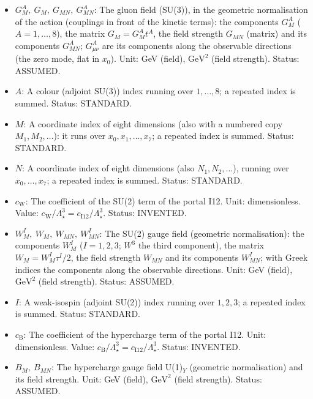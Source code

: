 \documentclass[
  10pt,
]{article}
\begin{document}
\begin{itemize}
  \(c_{\mathrm{G}}/\Lambda_\star^3 = c_{\mathrm{I12}}/\Lambda_\star^3\).
  Status: INVENTED.
\item
  \(G^A_M,\ G_M,\ G_{MN},\ G^A_{MN}\): The gluon field (SU(3)), in the
  geometric normalisation of the action (couplings in front of the
  kinetic terms): the components \(G^A_M\) (\(A = 1, \dots, 8\)), the
  matrix \(G_M = G^A_Mt^A\), the field strength \(G_{MN}\) (matrix) and
  its components \(G^A_{MN}\); \(G^A_{\mu\nu}\) are its components along
  the observable directions (the zero mode, flat in \(x_0\)). Unit: GeV
  (field), \(\mathrm{GeV}^{2}\) (field strength). Status: ASSUMED.
\item
  \(A\): A colour (adjoint SU(3)) index running over \(1, \dots, 8\); a
  repeated index is summed. Status: STANDARD.
\item
  \(M\): A coordinate index of eight dimensions (also with a numbered
  copy \(M_1, M_2, \dots\)): it runs over \(x_0, x_1, \dots, x_7\); a
  repeated index is summed. Status: STANDARD.
\item
  \(N\): A coordinate index of eight dimensions (also
  \(N_1, N_2, \dots\)), running over \(x_0, \dots, x_7\); a repeated
  index is summed. Status: STANDARD.
\item
  \(c_{\mathrm{W}}\): The coefficient of the SU(2) term of the portal
  I12. Unit: dimensionless. Value:
  \(c_{\mathrm{W}}/\Lambda_\star^3 = c_{\mathrm{I12}}/\Lambda_\star^3\).
  Status: INVENTED.
\item
  \(W^I_M,\ W_M,\ W_{MN},\ W^I_{MN}\): The SU(2) gauge field (geometric
  normalisation): the components \(W^I_M\) (\(I = 1, 2, 3\); \(W^3\) the
  third component), the matrix \(W_M = W^I_M\tau^I/2\), the field
  strength \(W_{MN}\) and its components \(W^I_{MN}\); with Greek
  indices the components along the observable directions. Unit: GeV
  (field), \(\mathrm{GeV}^{2}\) (field strength). Status: ASSUMED.
\item
  \(I\): A weak-isospin (adjoint SU(2)) index running over \(1, 2, 3\);
  a repeated index is summed. Status: STANDARD.
\item
  \(c_{\mathrm{B}}\): The coefficient of the hypercharge term of the
  portal I12. Unit: dimensionless. Value:
  \(c_{\mathrm{B}}/\Lambda_\star^3 = c_{\mathrm{I12}}/\Lambda_\star^3\).
  Status: INVENTED.
\item
  \(B_M,\ B_{MN}\): The hypercharge gauge field U(1)\(_Y\) (geometric
  normalisation) and its field strength. Unit: GeV (field),
  \(\mathrm{GeV}^{2}\) (field strength). Status: ASSUMED.
\end{itemize}
\end{document}
